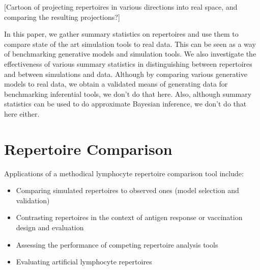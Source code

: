 \documentclass{article}
\begin{document}
[Cartoon of projecting repertoires in various directions into real space, and comparing the resulting projections?]

In this paper, we gather summary statistics on repertoires and use them to compare state of the art simulation tools to real data.
This can be seen as a way of benchmarking generative models and simulation tools.
We also investigate the effectiveness of various summary statistics in distinguishing between repertoires and between simulations and data.
Although by comparing various generative models to real data, we obtain a validated means of generating data for benchmarking inferential tools, we don't do that here.
Also, although summary statistics can be used to do approximate Bayesian inference, we don't do that here either.

\section*{Repertoire Comparison}

Applications of a methodical lymphocyte repertoire comparison tool include:
\begin{itemize}
\item Comparing simulated repertoires to observed ones (model selection and validation)
\item Contrasting repertoires in the context of antigen response or vaccination design and evaluation
\item Assessing the performance of competing repertoire analysis tools 
\item Evaluating artificial lymphocyte repertoires \cite{Finlay2012}
\end{itemize}
\end{document}
